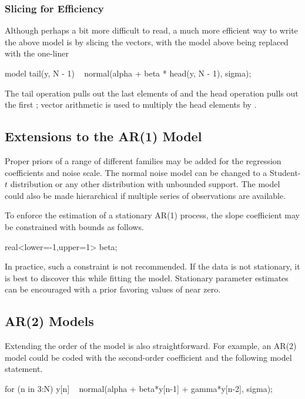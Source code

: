 \subsubsection{Slicing for Efficiency}

Although perhaps a bit more difficult to read, a much more efficient
way to write the above model is by slicing the vectors, with the model
above being replaced with the one-liner
%
\begin{stancode}
model {
  tail(y, N - 1) ~ normal(alpha + beta * head(y, N - 1), sigma);
}
\end{stancode}
%
The tail operation pulls out the last  elements of
 and the head operation pulls out the first ;
vector arithmetic is used to multiply the head elements by
.  



\subsection{Extensions to the AR(1) Model} 

Proper priors of a range of different families may be added for the
regression coefficients and noise scale.  The normal noise model can
be changed to a Student-$t$ distribution or any other distribution
with unbounded support.  The model could also be made hierarchical if
multiple series of observations are available.  

To enforce the estimation of a stationary AR(1) process, the slope
coefficient  may be constrained with bounds as follows.
%
\begin{stancode}
real<lower=-1,upper=1> beta;
\end{stancode}
%
In practice, such a constraint is not recommended.  If the data is not
stationary, it is best to discover this while fitting the model.
Stationary parameter estimates can be encouraged with a prior favoring
values of  near zero.


\subsection{AR(2) Models}

Extending the order of the model is also straightforward.  For
example, an AR(2) model could be coded with the second-order
coefficient  and the following model statement.
%
\begin{stancode}
for (n in 3:N)
  y[n] ~ normal(alpha + beta*y[n-1] + gamma*y[n-2], sigma);
\end{stancode}



